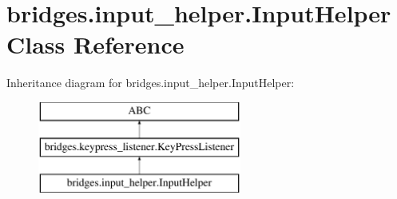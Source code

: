 \hypertarget{classbridges_1_1input__helper_1_1_input_helper}{}\section{bridges.\+input\+\_\+helper.\+Input\+Helper Class Reference}
\label{classbridges_1_1input__helper_1_1_input_helper}
Inheritance diagram for bridges.\+input\+\_\+helper.\+Input\+Helper\+:\begin{figure}[H]
\begin{center}
\leavevmode
\includegraphics[height=3.000000cm]{classbridges_1_1input__helper_1_1_input_helper}
\end{center}
\end{figure}
